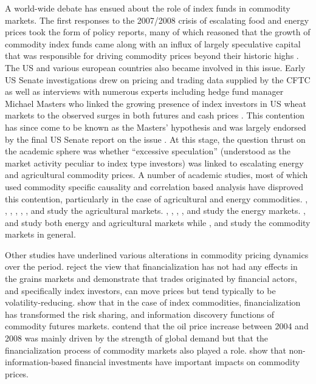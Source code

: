 \documentclass[12pt,]{article}
\begin{document}
A world-wide debate has ensued about the role of index funds in
commodity markets. The first responses to the 2007/2008 crisis of
escalating food and energy prices took the form of policy reports, many
of which reasoned that the growth of commodity index funds came along
with an influx of largely speculative capital that was responsible for
driving commodity prices beyond their historic highs
\citep{de_schutter_food_2010_1, gilbert_speculative_2010, herman_not_2011_1, schumann_hunger-makers_2011, unctad_global_2009}.
The US and various european countries also became involved in this
issue. Early US Senate investigations drew on pricing and trading data
supplied by the CFTC as well as interviews with numerous experts
including hedge fund manager Michael Masters who linked the growing
presence of index investors in US wheat markets to the observed surges
in both futures and cash prices
\citep{masters_testimony_2008, masters_accidental_2008}. This contention
has since come to be known as the Masters' hypothesis and was largely
endorsed by the final US Senate report on the issue
\citep{USSenate_Excessive_speculation_wheat_2009}. At this stage, the
question thrust on the academic sphere was whether ``excessive
speculation'' (understood as the market activity peculiar to index type
investors) was linked to escalating energy and agricultural commodity
prices. A number of academic studies, most of which used commodity
specific causality and correlation based analysis have disproved this
contention, particularly in the case of agricultural and energy
commodities. \citet{irwin_devil_2009}, \citet{sanders_adequacy_2010},
\citet{sanders_impact_2011}, \citet{sanders_new_2011},
\citet{irwin_commodity_2013}, \citet{brunetti_commodity_2014},
\citet{hamilton_effects_2015} and \citet{bruno_financialization_2017}
study the agricultural markets. \citet{buyuksahin_speculators_2011},
\citet{tokic_speculation_2012}, \citet{fattouh_role_2013},
\citet{kilian_role_2014}, \citet{knittel_simple_2016} and
\citet{manera_modelling_2016} study the energy markets.
\citet{bohl_does_2013_2}, \citet{kim_does_2015} and
\citet{boyd_prevalence_2016} study both energy and agricultural markets
while \citet{irwin_index_2011}, \citet{irwin_financialization_2012} and
\citet{stoll_commodity_2011} study the commodity markets in general.

Other studies have underlined various alterations in commodity pricing
dynamics over the period. \citet{gilbert_role_2014} reject the view that
financialization has not had any effects in the grains markets and
demonstrate that trades originated by financial actors, and specifically
index investors, can move prices but tend typically to be
volatility-reducing. \citet{cheng_financialization_2014} show that in
the case of index commodities, financialization has transformed the risk
sharing, and information discovery functions of commodity futures
markets. \citet{juvenal_speculation_2015} contend that the oil price
increase between 2004 and 2008 was mainly driven by the strength of
global demand but that the financialization process of commodity markets
also played a role. \citet{henderson_new_2015} show that
non-information-based financial investments have important impacts on
commodity prices.
\end{document}
